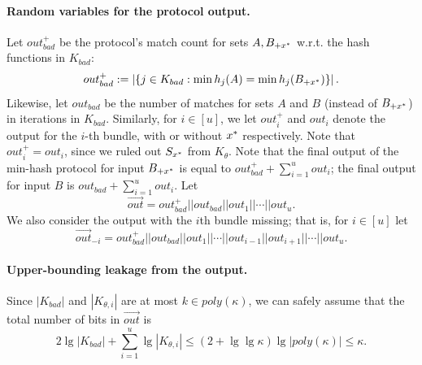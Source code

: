 \paragraph{Random variables for the protocol output.}
Let $out^+_{bad}$ be the protocol's match count for sets $A, B_{+x^*}$ w.r.t. the hash functions in $K_{bad}$:
\[ out^+_{bad} := \left | \{ j \in K_{bad} : \min h_j(A) = \min h_j(B_{+x^*}) \} \right |. \]
Likewise, let $out_{bad}$ be the number of matches for sets $A$ and $B$ (instead of $B_{+x^*}$) in iterations in $K_{bad}$. 
Similarly, for $i \in [u]$, we let $out^+_{i}$ and $out_i$ denote the output for the $i$-th
bundle, with or without ${x^*}$ respectively. 
Note that $out^+_{i} = out_i$, since we ruled out $S_{x^*}$ from $K_\theta$. 
Note that the final output of the min-hash protocol for input $B_{+x^*}$
is equal to $out^+_{bad} + \sum_{i=1}^u out_i$; 
the final output for input $B$ is $out_{bad} + \sum_{i=1}^u out_i$.
%
Let 
\[
\vec{out} = out^+_{bad} || out_{bad} || out_1 || \cdots || out_u.
\]
We also consider the output with the $i$th bundle missing; that is, for $i \in [u]$ let
\[
\vec{out}_{-i} = out^+_{bad} || out_{bad} || out_1 || \cdots
|| out_{i-1} || out_{i+1} || \cdots
|| out_u.
\]

\paragraph{Upper-bounding leakage from the output.}
Since $|K_{bad}|$ and $|K_{\theta,i}|$ are at most $k \in poly(\kappa)$, 
we can safely assume that the total number of bits 
in $\vec{out}$ is 
\[ 2\lg |K_{bad}| + \sum_{i=1}^u \lg |K_{\theta, i}| \leq ( 2 + \lg\lg \kappa) \lg |poly(\kappa)| \le \kappa. \]



